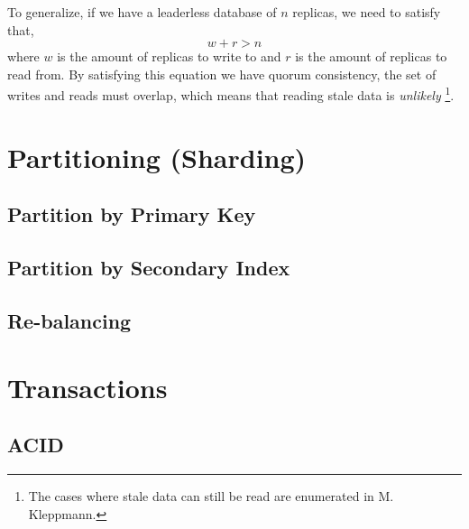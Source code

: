 To generalize, if we have a leaderless database of $n$ replicas,
we need to satisfy that,
$$
w + r > n
$$
where $w$ is the amount of replicas to write to and $r$ is the amount of replicas to read from.
By satisfying this equation we have quorum consistency,
the set of writes and reads must overlap,
which means that reading stale data is \textsl{unlikely}%
\footnote{The cases where stale data can still be read are enumerated in M. Kleppmann\cite{data-intensive}.}.

\section{Partitioning (Sharding)}

\subsection{Partition by Primary Key}

\subsection{Partition by Secondary Index}

\subsection{Re-balancing}

\section{Transactions}

\subsection{ACID}
